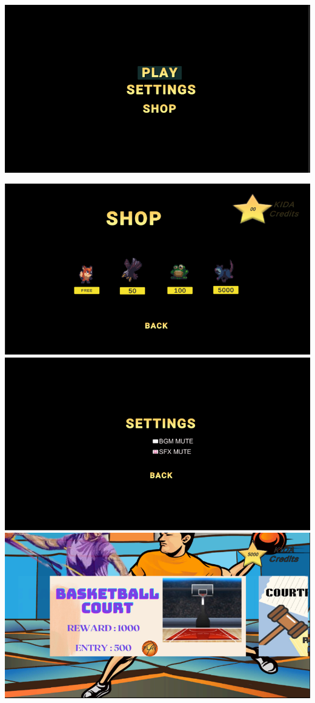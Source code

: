 \documentclass[12pt]{report}
\begin{document}
\begin{center}
\includegraphics[scale=0.7]{image24.png}

\includegraphics[scale=0.7]{image25.png}
\includegraphics[scale=0.7]{image26.png}
\includegraphics[scale=0.7]{image27.png}

\end{center}
\end{document}
